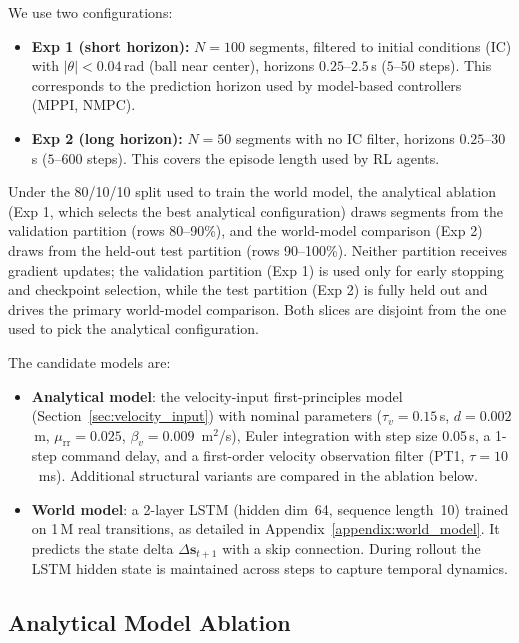 We use two configurations:
\begin{itemize}
  \item \textbf{Exp 1 (short horizon):} $N=100$ segments, filtered to
        initial conditions (IC) with $|\theta| < 0.04$\,rad
        (ball near center), horizons $0.25$--$2.5$\,s ($5$--$50$ steps).
        This corresponds to the prediction horizon used by model-based
        controllers (MPPI, NMPC).
  \item \textbf{Exp 2 (long horizon):} $N=50$ segments with no IC filter,
        horizons $0.25$--$30$\,s ($5$--$600$ steps).
        This covers the episode length used by RL agents.
\end{itemize}

Under the 80/10/10 split used to train the world model, the analytical
ablation (Exp 1, which selects the best analytical configuration) draws
segments from the validation partition (rows 80--90\%), and the
world-model comparison (Exp 2) draws from the held-out test partition
(rows 90--100\%). Neither partition receives gradient updates; the
validation partition (Exp 1) is used only for early stopping and
checkpoint selection, while the test partition (Exp 2) is fully held out
and drives the primary world-model comparison. Both slices are disjoint
from the one used to pick the analytical configuration.

The candidate models are:
\begin{itemize}
  \item \textbf{Analytical model}: the velocity-input first-principles model
        (Section~\ref{sec:velocity_input}) with nominal parameters
        ($\tau_v = 0.15$\,s, $d = 0.002$\,m, $\mu_\mathrm{rr} = 0.025$,
        $\beta_v = 0.009$~m$^2$/s), Euler integration with step size
        0.05\,s, a 1-step command delay, and a first-order velocity
        observation filter (PT1, $\tau = 10$~ms).
        Additional structural variants are compared in the ablation below.
  \item \textbf{World model}: a 2-layer LSTM (hidden dim~64, sequence
        length~10) trained on 1\,M real transitions, as detailed in
        Appendix~\ref{appendix:world_model}.  It predicts the state delta
        $\Delta\mathbf{s}_{t+1}$ with a skip connection.  During rollout
        the LSTM hidden state is maintained across steps to capture
        temporal dynamics.
\end{itemize}

\subsection{Analytical Model Ablation}
\label{sec:sim_val_ablation}

